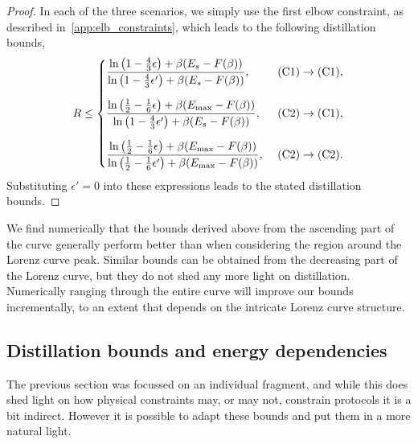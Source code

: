 \documentclass[pra,
aps,
twocolumn,
superscriptaddress,
groupedaddress,
nofootinbib,
reprint
]{revtex4-1}
\begin{document}
\begin{proof}
In each of the three scenarios, we simply use the first elbow constraint, as described in~\cref{app:elb_constraints}, which leads to the following distillation bounds,
\begin{equation}\label{eq:rate_bounds_proof}
	R \leq
	\begin{cases}
		\dfrac{\ln{\big( 1-\frac{4}{3}\epsilon \big)} + \beta (E_s - F(\beta))}{\ln{\big( 1-\frac{4}{3}\epsilon' \big)} + \beta (E_s - F(\beta))},\ &\rm{(C1)} \rightarrow \rm{(C1)}, \vspace{10pt}\\
		\dfrac{\ln{\big( \frac{1}{2}-\frac{1}{6}\epsilon \big)} + \beta (E_{\rm{max}} - F(\beta))}{\ln{\big( 1-\frac{4}{3}\epsilon' \big)} + \beta (E_s - F(\beta))},\ &\rm{(C2)} \rightarrow \rm{(C1)}, \vspace{10pt}\\
		\dfrac{\ln{\big( \frac{1}{2}-\frac{1}{6}\epsilon \big)} + \beta (E_{\rm{max}} - F(\beta))}{\ln{\big( \frac{1}{2}-\frac{1}{6}\epsilon' \big)} + \beta (E_{\rm{max}} - F(\beta))},\ &\rm{(C2)} \rightarrow \rm{(C2)}.
	\end{cases}
\end{equation}
Substituting $\epsilon' = 0$ into these expressions leads to the stated distillation bounds.

\end{proof}

We find numerically that the bounds derived above from the ascending part of the curve generally perform better than when considering the region around the Lorenz curve peak.
Similar bounds can be obtained from the decreasing part of the Lorenz curve, but they do not shed any more light on distillation.
Numerically ranging through the entire curve will improve our bounds incrementally, to an extent that depends on the intricate Lorenz curve structure.

\subsection{Distillation bounds and energy dependencies}
The previous section was focussed on an individual fragment, and while this does shed light on how physical constraints may, or may not, constrain protocols it is a bit indirect. However it is possible to adapt these bounds and put them in a more natural light.
\end{document}
